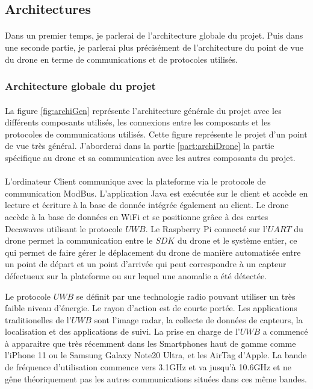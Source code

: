 \subsection{Architectures}
    \paragraph*{}
    Dans un premier temps, je parlerai de l'architecture globale du projet. Puis dans une seconde partie, je parlerai plus précisément de l'architecture du point de vue du drone en terme de communications et de protocoles utilisés.

    \subsubsection{Architecture globale du projet}
        \paragraph*{}
        La figure \ref{fig:archiGen} représente l'architecture générale du projet avec les différents composants utilisés, les connexions entre les composants et les protocoles de communications utilisés. Cette figure représente le projet d'un point de vue très général. J'aborderai dans la partie \ref{part:archiDrone} la partie spécifique au drone et sa communication avec les autres composants du projet.
        
        \paragraph*{}
        L'ordinateur Client communique avec la plateforme via le protocole de communication ModBus. L'application Java est exécutée sur le client et accède en lecture et écriture à la base de donnée intégrée également au client. Le drone accède à la base de données en WiFi et se positionne grâce à des cartes Decawaves utilisant le protocole $UWB$. Le Raspberry Pi connecté sur l'$UART$ du drone permet la communication entre le $SDK$ du drone et le système entier, ce qui permet de faire gérer le déplacement du drone de manière automatisée entre un point de départ et un point d'arrivée qui peut correspondre à un capteur défectueux sur la plateforme ou sur lequel une anomalie a été détectée.
        
        
        Le protocole $UWB$ se définit par une technologie radio pouvant utiliser un très faible niveau d'énergie. Le rayon d'action est de courte portée. Les applications traditionelles de l'$UWB$ sont l'image radar, la collecte de données de capteurs, la localisation et des applications de suivi. La prise en charge de l'$UWB$ a commencé à apparaitre que très récemment dans les Smartphones haut de gamme comme l'iPhone 11 ou le Samsung Galaxy Note20 Ultra, et les AirTag d'Apple. La bande de fréquence d'utilisation commence vers 3.1GHz et va jusqu'à 10.6GHz et ne gêne théoriquement pas les autres communications situées dans ces même bandes.
        
